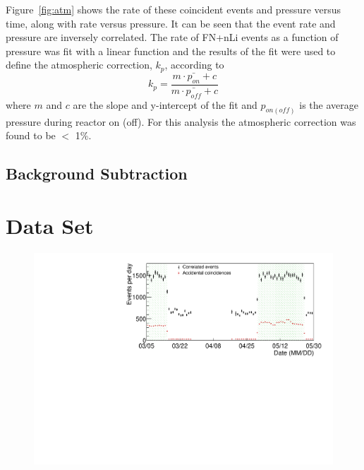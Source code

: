Figure~\ref{fig:atm} shows the rate of these coincident events and pressure versus time, along with rate versus pressure.
It can be seen that the event rate and pressure are inversely correlated. 
The rate of FN+nLi events as a function of pressure was fit with a linear function and the results of the fit were used to define the atmospheric correction, $k_p$, according to
\begin{equation}
k_p = \frac{m \cdot \bar{p_{on}} + c}{m \cdot \bar{p_{off}} + c}
\end{equation}
where $m$ and $c$ are the slope and y-intercept of the fit and $p_{on (off)}$ is the average pressure during reactor on (off).
For this analysis the atmospheric correction was found to be $<$ 1\%.


\subsection{Background Subtraction}




\section{Data Set}
\begin{figure}[H]
	\centering
	\includegraphics[width=0.7\linewidth]{tex/7-oscillation-images/EvtRates}
	\caption{}
	\label{fig:evtrates}
\end{figure}



